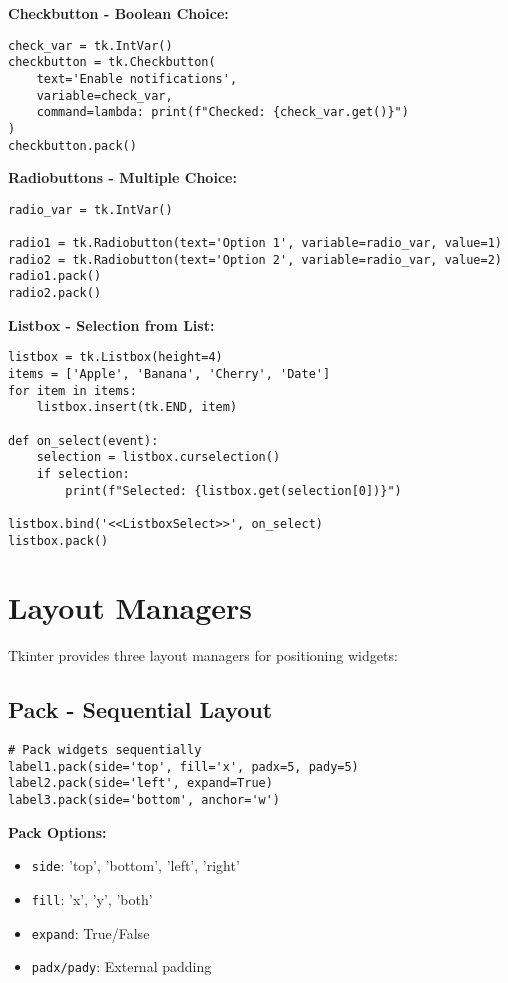 \documentclass[12pt,a4paper]{article}
\begin{document}
\textbf{Checkbutton - Boolean Choice:}
\begin{lstlisting}
check_var = tk.IntVar()
checkbutton = tk.Checkbutton(
    text='Enable notifications',
    variable=check_var,
    command=lambda: print(f"Checked: {check_var.get()}")
)
checkbutton.pack()
\end{lstlisting}

\textbf{Radiobuttons - Multiple Choice:}
\begin{lstlisting}
radio_var = tk.IntVar()

radio1 = tk.Radiobutton(text='Option 1', variable=radio_var, value=1)
radio2 = tk.Radiobutton(text='Option 2', variable=radio_var, value=2)
radio1.pack()
radio2.pack()
\end{lstlisting}

\textbf{Listbox - Selection from List:}
\begin{lstlisting}
listbox = tk.Listbox(height=4)
items = ['Apple', 'Banana', 'Cherry', 'Date']
for item in items:
    listbox.insert(tk.END, item)

def on_select(event):
    selection = listbox.curselection()
    if selection:
        print(f"Selected: {listbox.get(selection[0])}")

listbox.bind('<<ListboxSelect>>', on_select)
listbox.pack()
\end{lstlisting}

\section{Layout Managers}

Tkinter provides three layout managers for positioning widgets:

\subsection{Pack - Sequential Layout}

\begin{tcolorbox}[colback=red!5!white,colframe=red!75!black,title=Pack Layout Manager]
\begin{lstlisting}
# Pack widgets sequentially
label1.pack(side='top', fill='x', padx=5, pady=5)
label2.pack(side='left', expand=True)
label3.pack(side='bottom', anchor='w')
\end{lstlisting}
\end{tcolorbox}

\textbf{Pack Options:}
\begin{itemize}
    \item \texttt{side}: 'top', 'bottom', 'left', 'right'
    \item \texttt{fill}: 'x', 'y', 'both'
    \item \texttt{expand}: True/False
    \item \texttt{padx/pady}: External padding
\end{itemize}
\end{document}
